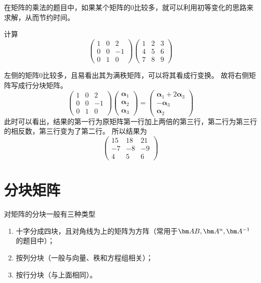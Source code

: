 在矩阵的乘法的题目中，如果某个矩阵的$0$比较多，就可以利用初等变化的思路来求解，从而节约时间。
\begin{example}
    计算
    \[
        \begin{pmatrix}
            1 & 0 & 2  \\
            0 & 0 & -1 \\
            0 & 1 & 0
        \end{pmatrix}
        \begin{pmatrix}
            1 & 2 & 3 \\
            4 & 5 & 6 \\
            7 & 8 & 9
        \end{pmatrix}
    \]
\end{example}
\begin{solution}
    左侧的矩阵$0$比较多，且易看出其为满秩矩阵，可以将其看成行变换。
    故将右侧矩阵写成行分块矩阵。
    \[
        \begin{pmatrix}
            1 & 0 & 2  \\
            0 & 0 & -1 \\
            0 & 1 & 0
        \end{pmatrix}
        \begin{pmatrix}
            \bm{\alpha}_1 \\
            \bm{\alpha}_2 \\
            \bm{\alpha}_3
        \end{pmatrix}
        =
        \begin{pmatrix}
            \bm{\alpha}_1 + 2\bm{\alpha}_3 \\
            -\bm{\alpha}_3                 \\
            \bm{\alpha}_2
        \end{pmatrix}
    \]
    此时可以看出，结果的第一行为原矩阵第一行加上两倍的第三行，第二行为第三行的相反数，第三行变为了第二行。
    所以结果为
    \[
        \begin{pmatrix}
            15 & 18 & 21 \\
            -7 & -8 & -9 \\
            4  & 5  & 6
        \end{pmatrix}
    \]
\end{solution}

\section{分块矩阵}
对矩阵的分块一般有三种类型
\begin{enumerate}[(1)]
    \item 十字分成四块，且对角线为上的矩阵为方阵（常用于$\mat{AB},\mat{A}^n,\mat{A}^{-1}$的题目中）；
    \item 按列分块（一般与向量、秩和方程组相关）；
    \item 按行分块（与上面相同）。
\end{enumerate}

